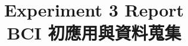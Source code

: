 \documentclass[a4paper, 12pt]{article}
\title{
    Experiment 3 Report \\
    BCI 初應用與資料蒐集
}
\begin{document}
\maketitle








\begin{appendices}


\end{appendices}



\end{document}
